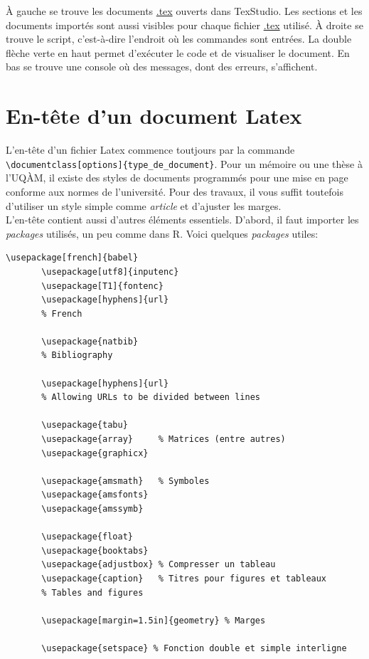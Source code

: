 \documentclass[12pt]{article}
\begin{document}
   À gauche se trouve les documents \url{.tex} ouverts dans TexStudio. Les sections et les documents importés sont aussi visibles pour chaque fichier \url{.tex} utilisé. À droite se trouve le script, c'est-à-dire l'endroit où les commandes sont entrées. La double flèche verte en haut permet d'exécuter le code et de visualiser le document. En bas se trouve une console où des messages, dont des erreurs, s'affichent.
   
   \newpage
   \section{En-tête d'un document Latex}
   
   L'en-tête d'un fichier Latex commence toutjours par la commande \\
   \lstinline|\documentclass[options]{type_de_document}|. Pour un mémoire ou une thèse à l'UQÀM, il existe des styles de documents programmés pour une mise en page conforme aux normes de l'université. Pour des travaux, il vous suffit toutefois d'utiliser un style simple comme \textit{article} et d'ajuster les marges. \\
   
   L'en-tête contient aussi d'autres éléments essentiels. D'abord, il faut importer les \textit{packages} utilisés, un peu comme dans R. Voici quelques \textit{packages} utiles:
   
   \begin{lstlisting}[frame=single]
	   \usepackage[french]{babel}
	   \usepackage[utf8]{inputenc}
	   \usepackage[T1]{fontenc}
	   \usepackage[hyphens]{url}
	   % French
	   
	   \usepackage{natbib}
	   % Bibliography
	   
	   \usepackage[hyphens]{url}
	   % Allowing URLs to be divided between lines
	   
	   \usepackage{tabu}
	   \usepackage{array}     % Matrices (entre autres)
	   \usepackage{graphicx}
	   
	   \usepackage{amsmath}   % Symboles
	   \usepackage{amsfonts}
	   \usepackage{amssymb}
	   
	   \usepackage{float}
	   \usepackage{booktabs}
	   \usepackage{adjustbox} % Compresser un tableau
	   \usepackage{caption}   % Titres pour figures et tableaux
	   % Tables and figures
	   
	   \usepackage[margin=1.5in]{geometry} % Marges
	   
	   \usepackage{setspace} % Fonction double et simple interligne
   \end{lstlisting}
   
\end{document}

